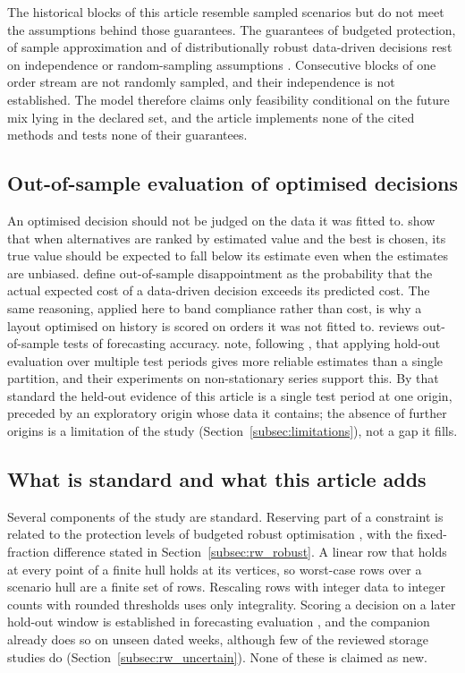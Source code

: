 The historical blocks of this article resemble sampled scenarios but do not meet the assumptions behind those guarantees. The guarantees of budgeted protection, of sample approximation and of distributionally robust data-driven decisions rest on independence or random-sampling assumptions \citep{bertsimas2004price,luedtke2008sample,vanparys2021data}. Consecutive blocks of one order stream are not randomly sampled, and their independence is not established. The model therefore claims only feasibility conditional on the future mix lying in the declared set, and the article implements none of the cited methods and tests none of their guarantees.

\subsection{Out-of-sample evaluation of optimised decisions}\label{subsec:rw_oos}
An optimised decision should not be judged on the data it was fitted to. \citet{smith2006optimizer} show that when alternatives are ranked by estimated value and the best is chosen, its true value should be expected to fall below its estimate even when the estimates are unbiased. \citet{vanparys2021data} define out-of-sample disappointment as the probability that the actual expected cost of a data-driven decision exceeds its predicted cost. The same reasoning, applied here to band compliance rather than cost, is why a layout optimised on history is scored on orders it was not fitted to. \citet{tashman2000outofsample} reviews out-of-sample tests of forecasting accuracy. \citet{cerqueira2020evaluating} note, following \citet{tashman2000outofsample}, that applying hold-out evaluation over multiple test periods gives more reliable estimates than a single partition, and their experiments on non-stationary series support this. By that standard the held-out evidence of this article is a single test period at one origin, preceded by an exploratory origin whose data it contains; the absence of further origins is a limitation of the study (Section~\ref{subsec:limitations}), not a gap it fills.

\subsection{What is standard and what this article adds}\label{subsec:rw_position}
Several components of the study are standard. Reserving part of a constraint is related to the protection levels of budgeted robust optimisation \citep{bertsimas2004price}, with the fixed-fraction difference stated in Section~\ref{subsec:rw_robust}. A linear row that holds at every point of a finite hull holds at its vertices, so worst-case rows over a scenario hull are a finite set of rows. Rescaling rows with integer data to integer counts with rounded thresholds uses only integrality. Scoring a decision on a later hold-out window is established in forecasting evaluation \citep{tashman2000outofsample,cerqueira2020evaluating}, and the companion already does so on unseen dated weeks, although few of the reviewed storage studies do (Section~\ref{subsec:rw_uncertain}). None of these is claimed as new.

